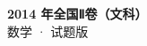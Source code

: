 \documentclass[zihao=-4, a4paper]{ctexart}
\begin{document}
\begin{center}
  {\Large\bfseries 2014 年全国Ⅱ卷（文科）}\\[4pt]
  {\large 数学 · 试题版}
\end{center}
\medskip
{}

\end{document}

